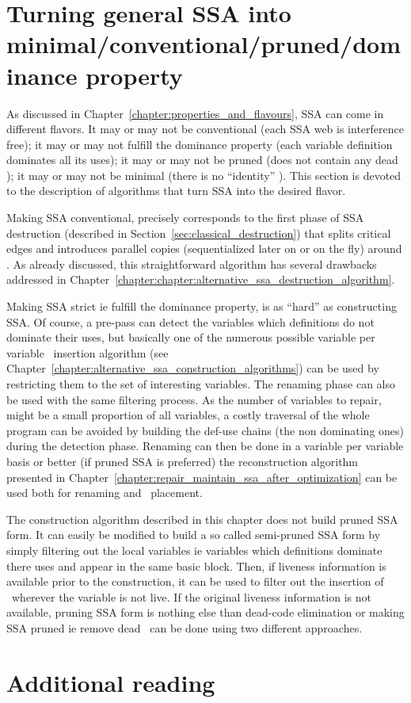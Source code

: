 \section{Turning general SSA into minimal/conventional/pruned/dominance property}

As discussed in Chapter~\ref{chapter:properties_and_flavours}, SSA can come in different flavors. It may or may not be conventional (each SSA web is interference free); it may or may not fulfill the dominance property (each variable definition dominates all its uses); it may or may not be pruned (does not contain any dead \phiop); it may or may not be minimal (there is no ``identity'' \phiops).
This section is devoted to the description of algorithms that turn SSA into the desired flavor.

Making SSA conventional, precisely corresponds to the first phase of SSA destruction (described in Section~\ref{sec:classical_destruction}) that splits critical edges and introduces parallel copies (sequentialized later on or on the fly) around \phiops. As already discussed, this straightforward algorithm has several drawbacks addressed in Chapter~\ref{chapter:chapter:alternative_ssa_destruction_algorithm}.

Making SSA strict ie fulfill the dominance property, is as ``hard'' as constructing SSA. Of course, a pre-pass can detect the variables which definitions do not dominate their uses, but basically one of the numerous possible variable per variable \phiops\ insertion algorithm (see Chapter~\ref{chapter:alternative_ssa_construction_algorithms}) can be used by restricting them to the set of interesting variables. The renaming phase can also be used with the same filtering process. As the number of variables to repair, might be a small proportion of all variables, a costly traversal of the whole program can be avoided by building the def-use chains (the non dominating ones) during the detection phase. Renaming can then be done in a variable per variable basis or better (if pruned SSA is preferred) the reconstruction algorithm presented in Chapter~\ref{chapter:repair_maintain_ssa_after_optimization} can be used both for renaming and \phiops\ placement.

The construction algorithm described in this chapter does not build pruned SSA form. It can easily be modified to build a so called semi-pruned SSA form by simply filtering out the local variables ie variables which definitions dominate there uses and appear in the same basic block. Then, if liveness information is available prior to the construction, it can be used to filter out the insertion of \phiops\ wherever the variable is not live.
If the original liveness information is not available, pruning SSA form is nothing else than dead-code elimination or making SSA pruned ie remove dead \phiops\ can be done using two different approaches. 

\section{Additional reading}

